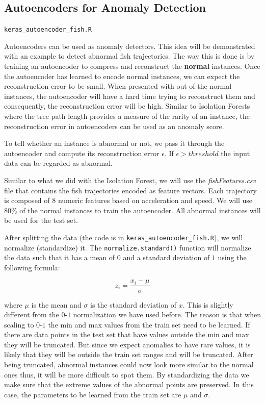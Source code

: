 \documentclass[
  11pt,
]{krantz}
\makeatletter
\newenvironment{kframe}{%
\medskip{}
\setlength{\fboxsep}{.8em}
 \def\at@end@of@kframe{}%
 \ifinner\ifhmode%
  \def\at@end@of@kframe{\end{minipage}}%
  \begin{minipage}{\columnwidth}%
 \fi\fi%
 \def\FrameCommand##1{\hskip\@totalleftmargin \hskip-\fboxsep
 \colorbox{shadecolor}{##1}\hskip-\fboxsep
     \hskip-\linewidth \hskip-\@totalleftmargin \hskip\columnwidth}%
 \MakeFramed {\advance\hsize-\width
   \@totalleftmargin\z@ \linewidth\hsize
   \@setminipage}}%
 {\par\unskip\endMakeFramed%
 \at@end@of@kframe}
\newenvironment{rmdblock}[1]
  {
  \begin{itemize}
  \renewcommand{\labelitemi}{
    \raisebox{-.7\height}[0pt][0pt]{
      {\setkeys{Gin}{width=3em,keepaspectratio}\texttt{[image: images/icons/\#1]}}
    }
  }
  \setlength{\fboxsep}{1em}
  \begin{kframe}
  \item
  }
  {
  \end{kframe}
  \end{itemize}
  }
\newenvironment{rmdfolder}
  {\begin{rmdblock}{folder}}
  {\end{rmdblock}}
\makeatother
\begin{document}
\hypertarget{autoencoders-for-anomaly-detection}{%
\subsection{Autoencoders for Anomaly Detection}\label{autoencoders-for-anomaly-detection}}

\begin{rmdfolder}
\texttt{keras\_autoencoder\_fish.R}
\end{rmdfolder}

Autoencoders can be used as anomaly detectors. This idea will be demonstrated with an example to detect abnormal fish trajectories. The way this is done is by training an autoencoder to compress and reconstruct the \textbf{normal} instances. Once the autoencoder has learned to encode normal instances, we can expect the reconstruction error to be small. When presented with out-of-the-normal instances, the autoencoder will have a hard time trying to reconstruct them and consequently, the reconstruction error will be high. Similar to Isolation Forests where the tree path length provides a measure of the rarity of an instance, the reconstruction error in autoencoders can be used as an anomaly score.

To tell whether an instance is abnormal or not, we pass it through the autoencoder and compute its reconstruction error \(\epsilon\). If \(\epsilon > threshold\) the input data can be regarded as abnormal.

Similar to what we did with the Isolation Forest, we will use the \emph{fishFeatures.csv} file that contains the fish trajectories encoded as feature vectors. Each trajectory is composed of \(8\) numeric features based on acceleration and speed. We will use \(80\%\) of the normal instances to train the autoencoder. All abnormal instances will be used for the test set.

After splitting the data (the code is in \texttt{keras\_autoencoder\_fish.R}), we will normalize (standardize) it. The \texttt{normalize.standard()} function will normalize the data such that it has a mean of \(0\) and a standard deviation of \(1\) using the following formula:

\begin{equation}
  z_i = \frac{x_i - \mu}{\sigma}
  \label{eq:standardize}
\end{equation}

where \(\mu\) is the mean and \(\sigma\) is the standard deviation of \(x\). This is slightly different from the \(0\)-\(1\) normalization we have used before. The reason is that when scaling to \(0\)-\(1\) the min and max values from the train set need to be learned. If there are data points in the test set that have values outside the min and max they will be truncated. But since we expect anomalies to have rare values, it is likely that they will be outside the train set ranges and will be truncated. After being truncated, abnormal instances could now look more similar to the normal ones thus, it will be more difficult to spot them. By standardizing the data we make sure that the extreme values of the abnormal points are preserved. In this case, the parameters to be learned from the train set are \(\mu\) and \(\sigma\).
\end{document}
